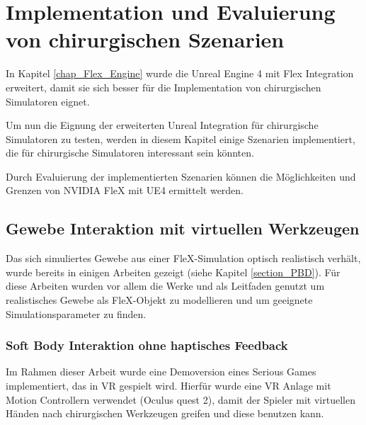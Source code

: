 \chapter{Implementation und Evaluierung von chirurgischen Szenarien}
\label{chap_Szenarien}

In Kapitel \ref{chap_Flex_Engine} wurde die Unreal Engine 4 mit Flex Integration erweitert, damit sie sich besser für die Implementation von chirurgischen Simulatoren eignet. 

Um nun die Eignung der erweiterten Unreal Integration für chirurgische Simulatoren zu testen, werden in diesem Kapitel einige Szenarien implementiert, die für chirurgische Simulatoren interessant sein könnten.

Durch Evaluierung der implementierten Szenarien können die Möglichkeiten und Grenzen von NVIDIA FleX mit \ac{UE4} ermittelt werden.


\section{Gewebe Interaktion mit virtuellen Werkzeugen}
\label{sec_FSystem}

Das sich simuliertes Gewebe aus einer FleX-Simulation optisch realistisch verhält, wurde bereits in einigen Arbeiten gezeigt (siehe Kapitel \ref{section_PBD}). Für diese Arbeiten wurden vor allem die Werke \cite{PBDKidney} und \cite{BreastBiopsy} als Leitfaden genutzt um realistisches Gewebe als FleX-Objekt zu modellieren und um geeignete Simulationsparameter zu finden.

\subsection{Soft Body Interaktion ohne haptisches Feedback}
Im Rahmen dieser Arbeit wurde eine Demoversion eines Serious Games implementiert, das in VR gespielt wird. Hierfür wurde eine VR Anlage mit Motion Controllern verwendet (Oculus quest 2), damit der Spieler mit virtuellen Händen nach chirurgischen Werkzeugen greifen und diese benutzen kann.

